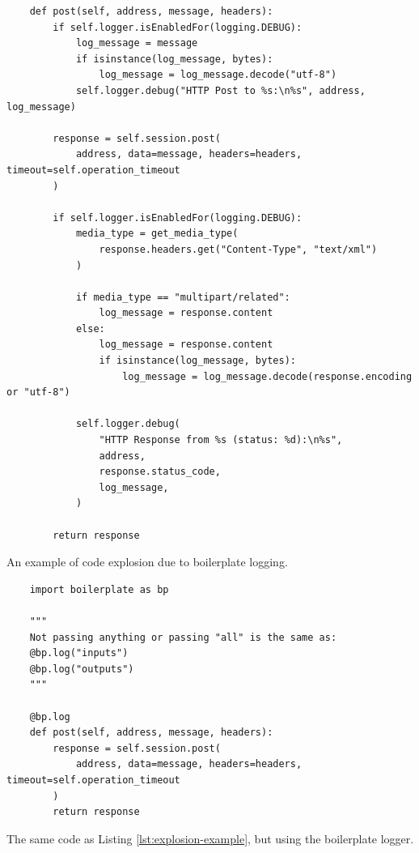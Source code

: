 \documentclass[acmsmall,review,authorversion]{acmart}
\begin{document}
    \begin{listing}[H]
    \begin{verbatim}
    def post(self, address, message, headers):
        if self.logger.isEnabledFor(logging.DEBUG):
            log_message = message
            if isinstance(log_message, bytes):
                log_message = log_message.decode("utf-8")
            self.logger.debug("HTTP Post to %s:\n%s", address, log_message)

        response = self.session.post(
            address, data=message, headers=headers, timeout=self.operation_timeout
        )

        if self.logger.isEnabledFor(logging.DEBUG):
            media_type = get_media_type(
                response.headers.get("Content-Type", "text/xml")
            )

            if media_type == "multipart/related":
                log_message = response.content
            else:
                log_message = response.content
                if isinstance(log_message, bytes):
                    log_message = log_message.decode(response.encoding or "utf-8")

            self.logger.debug(
                "HTTP Response from %s (status: %d):\n%s",
                address,
                response.status_code,
                log_message,
            )

        return response
    \end{verbatim}
    \caption{An example of code explosion due to boilerplate logging.}
    \label{lst:explosion-example}
    \end{listing}

    \begin{listing}[H]
    \begin{verbatim}
    import boilerplate as bp

    """
    Not passing anything or passing "all" is the same as:
    @bp.log("inputs")
    @bp.log("outputs")
    """

    @bp.log
    def post(self, address, message, headers):
        response = self.session.post(
            address, data=message, headers=headers, timeout=self.operation_timeout
        )
        return response
    \end{verbatim}
    \caption{The same code as Listing \ref{lst:explosion-example}, but using the boilerplate logger.}
    \label{lst:cleaned-example}
    \end{listing}
\end{document}
